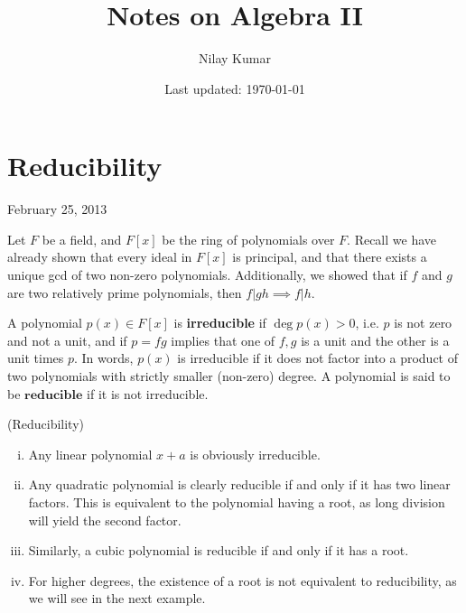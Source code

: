 \documentclass{../mathnotes}
\title{Notes on Algebra II}
\author{Nilay Kumar}
\date{Last updated: \today}
\begin{document}
\maketitle

\section{Reducibility}

February 25, 2013

Let $F$ be a field, and $F[x]$ be the ring of polynomials over $F$. Recall we have already shown that every ideal
in $F[x]$ is principal, and that there exists a unique gcd of two non-zero polynomials. Additionally, we showed that
if $f$ and $g$ are two relatively prime polynomials, then $f|gh\implies f|h$.

\begin{defn}
    A polynomial $p(x)\in F[x]$ is \textbf{irreducible} if $\deg p(x)>0$, i.e. $p$ is not zero and not a unit,
    and if $p=fg$ implies that one of $f,g$ is a unit and the other is a unit times $p$. In words, $p(x)$ is
    irreducible if it does not factor into a product of two polynomials with strictly smaller (non-zero)
    degree. A polynomial is said to be $\textbf{reducible}$ if it is not irreducible.
\end{defn}

\begin{exmp}(Reducibility)
    \begin{enumerate}[(i)]
        \item Any linear polynomial $x+a$ is obviously irreducible.
        \item Any quadratic polynomial is clearly reducible if and only if it has two linear factors.
            This is equivalent to the polynomial having a root, as long division will yield the second factor.
        \item Similarly, a cubic polynomial is reducible if and only if it has a root.
        \item For higher degrees, the existence of a root is not equivalent to reducibility, as we will
            see in the next example.
    \end{enumerate}
\end{exmp}
\end{document}
